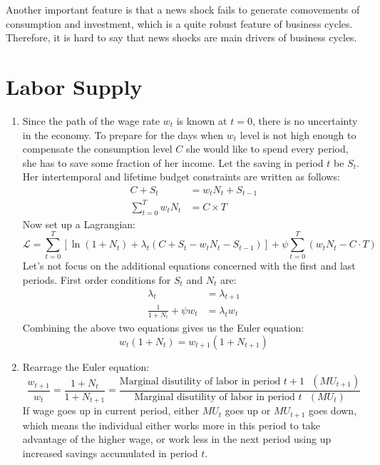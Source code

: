 \documentclass[11pt]{amsart}
\begin{document}
Another important feature is that a news shock fails to generate comovements of consumption and investment, which is a quite robust feature of business cycles. Therefore, it is hard to say that news shocks are main drivers of business cycles. 

\section{Labor Supply}
\begin{enumerate}[label=(\alph*)]
	\item Since the path of the wage rate $w_t$ is known at $t=0$, there is no uncertainty in the economy. To prepare for the days when $w_t$ level is not high enough to compensate the consumption level $C$ she would like to spend every period, she has to save some fraction of her income. Let the saving in period $t$ be $S_t$. Her intertemporal and lifetime budget constraints are written as follows: 
	\begin{align*}
	C + S_t &= w_t N_t + S_{t-1} \\
	\sum_{t=0}^{T} w_t N_t & = C \times T
	\end{align*} Now set up a Lagrangian: 
	\begin{equation*}
	\mathcal{L} = \sum_{t=0}^{T}  \left[ \ln (1+ N_t) + \lambda_t \left(C + S_t - w_t N_t - S_{t-1} \right) \right] + \psi \sum_{t=0}^{T} \left( w_t N_t - C \cdot T\right)  
	\end{equation*}
    Let's not focus on the additional equations concerned with the first and last periods. First order conditions for $S_t$ and $N_t$ are: 
    \begin{align*}
    \lambda_t &= \lambda_{t+1} \\
    \frac{1}{1+N_t} + \psi w_t &= \lambda_t w_t 
    \end{align*}
    Combining the above two equations gives us the Euler equation: 
    \begin{equation*}
    w_t (1+ N_t) = w_{t+1} (1+N_{t+1})
    \end{equation*}
    \item Rearrage the Euler equation: 
    \begin{equation*}
    \frac{w_{t+1}}{w_t} = \frac{1+N_t}{1+ N_{t+1}} = \frac{\text{Marginal disutility of labor in period $t+1$ } (MU_{t+1}) }{\text{Marginal disutility of labor in period $t$ } (MU_t) }
    \end{equation*}
    If wage goes up in current period, either $MU_t$ goes up or $MU_{t+1}$ goes down, which means the individual either works more in this period to take advantage of the higher wage, or work less in the next period using up increased savings accumulated in period $t$. 
    

\end{enumerate}
\end{document}
